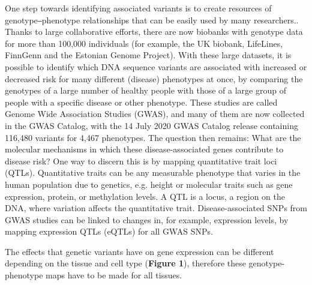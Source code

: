 One step towards identifying associated variants is to create resources of genotype‒phenotype relationships that can be easily used by many researchers.\cite{claussnitzerBriefHistoryHuman2020}. Thanks to large collaborative efforts, there are now biobanks with genotype data for more than 100,000 individuals (for example, the UK biobank\cite{sudlowUKBiobankOpen2015}, LifeLines\cite{tigchelaarCohortProfileLifeLines2015}, FinnGenn\cite{fingennFinnGenDocumentationR32020} and the Estonian Genome Project\cite{metspaluEstonianGenomeProject2004}). With these large datasets, it is possible to identify which DNA sequence variants are associated with increased or decreased risk for many different (disease) phenotypes at once, by comparing the genotypes of a large number of healthy people with those of a large group of people with a specific disease or other phenotype. These studies are called Genome Wide Association Studies (GWAS), and many of them are now collected in the GWAS Catalog\cite{bunielloNHGRIEBIGWASCatalog2019}, with the 14 July 2020 GWAS Catalog release containing 116,480 variants for 4,467 phenotypes. The question then remains: What are the molecular mechanisms in which these disease-associated genes contribute to disease risk? One way to discern this is by mapping quantitative trait loci\cite{membersofthecomplextraitconsortiumNatureIdentificationQuantitative2003} (QTLs). Quantitative traits can be any measurable phenotype that varies in the human population due to genetics, e.g. height or molecular traits such as gene expression, protein, or methylation levels. A QTL is a locus, a region on the DNA, where variation affects the quantitative trait. Disease-associated SNPs from GWAS studies can be linked to changes in, for example, expression levels, by mapping expression QTLs (eQTLs) for all GWAS SNPs.


The effects that genetic variants have on gene expression can be different depending on the tissue and cell type (\textbf{Figure 1}), therefore these genotype-phenotype maps have to be made for all tissues. 




